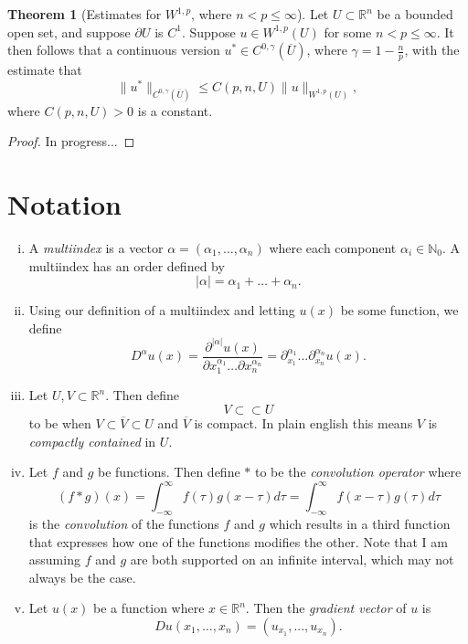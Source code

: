 \documentclass[11pt]{article}
\theoremstyle{definition}
\newtheorem*{theorem}{Theorem}
\begin{document}
\begin{theorem}[Estimates for $W^{1,p}$, where $n < p \leq \infty$]
Let $U \subset \mathbb{R}^n$ be a bounded open set, and suppose $\partial U$ is $C^1$.
	Suppose $u \in W^{1,p}(U)$ for some $n < p \leq \infty$. It then follows that a continuous version $u^* \in C^{0,\gamma}(\overline{U})$,
where $\gamma = 1 - \frac{n}{p}$, with the estimate that
	\[\|u^*\|_{C^{0,\gamma}(\overline{U})} \leq C(p,n,U)\|u\|_{W^{1,p}(U)},\]
where $C(p,n,U) > 0$ is a constant.
\end{theorem}
\begin{proof}
In progress...
\end{proof}

\newpage

\section{Notation}
\begin{enumerate}[(i)]
	\item A \textit{multiindex} is a vector $\alpha = (\alpha_1, \dots, \alpha_n)$ where each component $\alpha_i \in \mathbb{N}_0$.
A multiindex has an order defined by
\[|\alpha| = \alpha_1 + \dots + \alpha_n.\]

\item Using our definition of a multiindex and letting $u(x)$ be some function, we define
\[D^{\alpha}u(x) = \frac{\partial^{|\alpha|}u(x)}{\partial x_1^{\alpha_1} \dots \partial x_n^{\alpha_n}} = \partial_{x_1}^{\alpha_1}\dots\partial_{x_n}^{\alpha_n}u(x).\]

\item Let $U,V \subset \mathbb{R}^n$. Then define
\[V \subset\subset U\]
to be when $V \subset \overline{V} \subset U$ and $\overline{V}$ is compact. In plain english this means $V$ is \textit{compactly contained} in $U$.

\item Let $f$ and $g$ be functions. Then define $*$ to be the \textit{convolution operator} where
\[(f*g)(x) = \int_{-\infty}^{\infty}{f(\tau)g(x - \tau)d\tau} = \int_{-\infty}^{\infty}{f(x - \tau)g(\tau)d\tau}\]
is the \textit{convolution} of the functions $f$ and $g$ which results in a third function that expresses
how one of the functions modifies the other. Note that I am assuming $f$ and $g$ are both supported on an
infinite interval, which may not always be the case.

\item Let $u(x)$ be a function where $x \in \mathbb{R}^n$. Then the \textit{gradient vector} of $u$ is 
	\[Du(x_1,\dots,x_n) = (u_{x_1},...,u_{x_n}).\]
\end{enumerate}
\end{document}
